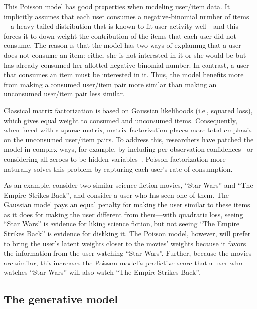 \documentclass{sig-alternate}
\begin{document}

This Poisson model has good properties when modeling user/item data.
It implicitly assumes that each user consumes a negative-binomial number of
items---a heavy-tailed distribution that is known to fit user activity
well~\cite{Goodhardt:1984}--and this forces it to down-weight the
contribution of the items that each user did not consume. The reason
is that the model has two ways of explaining that a user does not
consume an item: either she is not interested in it or she would be
but has already consumed her allotted negative-binomial number.  In
contrast, a user that consumes an item must be interested in it.
Thus, the model benefits more from making a consumed user/item pair
more similar than making an unconsumed user/item pair less similar.

Classical matrix factorization is based on Gaussian likelihoods (i.e.,
squared loss), which gives equal weight to consumed and unconsumed
items.  Consequently, when faced with a sparse matrix, matrix
factorization places more total emphasis on the unconsumed user/item
pairs.  To address this, researchers have patched the model in complex
ways, for example, by including per-observation
confidences~\cite{Koren:2009} or considering all zeroes to be hidden
variables~\cite{Paquet:2013p9197}.  Poisson factorization more naturally solves this
problem by capturing each user's rate of consumption.

As an example, consider two similar science fiction movies, ``Star
Wars'' and ``The Empire Strikes Back'', and consider a user who has
seen one of them.  The Gaussian model pays an equal penalty for making
the user similar to these items as it does for making the user
different from them---with quadratic loss, seeing ``Star Wars'' is
evidence for liking science fiction, but not seeing ``The Empire
Strikes Back'' is evidence for disliking it.  The Poisson model,
however, will prefer to bring the user's latent weights closer to the
movies' weights because it favors the information from the user
watching ``Star Wars''. Further, because the movies are similar, this
increases the Poisson model's predictive score that a user who watches
``Star Wars'' will also watch ``The Empire Strikes Back''.


\subsection{The generative model}
\end{document}
